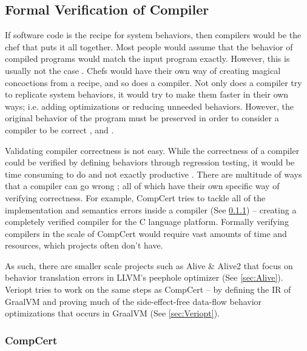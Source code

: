 \subsection{Formal Verification of Compiler}

If software code is the recipe for system behaviors, then compilers would be the chef that puts it all together. Most people would assume that 
the behavior of compiled programs would match the input program exactly. However, this is usually not the case \cite{compcertVerification}. 
Chefs would have their own way of creating magical concoctions from a recipe, and so does a compiler. Not only does a compiler try to replicate 
system behaviors, it would try to make them faster in their own ways; i.e. adding optimizations or reducing unneeded behaviors. However, the 
original behavior of the program must be preserved in order to consider a compiler to be correct 
\cite{compcertVerification,AliveInLean,Alive2}, and \cite{Term_Graph_Optimizations}.

Validating compiler correctness is not easy. While the correctness of a compiler could be verified by defining behaviors through regression testing, 
it would be time consuming to do and not exactly productive \cite{randomTesting,compcertVerification}. There are multitude of ways that a 
compiler can go wrong \cite[Sec. 1.2]{CompilerOptimization}; all of which have their own specific way of verifying correctness. For example, 
CompCert \cite{compcertVerification} tries to tackle all of the implementation and semantics errors inside a compiler (See \ref{sec:CompCert}) -- 
creating a completely verified compiler for the C language platform. Formally verifying compilers in the scale of CompCert would require vast amounts 
of time and resources, which projects often don't have.

As such, there are smaller scale projects such as Alive \cite{AliveInLean} \& Alive2 \cite{Alive2} that focus on behavior translation errors 
in LLVM's peephole optimizer (See \ref{sec:Alive}). Veriopt tries to work on the same steps as CompCert -- by defining the IR of GraalVM and 
proving much of the side-effect-free data-flow behavior optimizations that occurs in GraalVM 
\cite{ATVA21_GraalVM_IR_Semantics,Term_Graph_Optimizations} (See \ref{sec:Veriopt}).

\subsubsection{CompCert}
\label{sec:CompCert}

